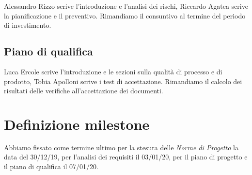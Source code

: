 \documentclass{article}
\begin{document}
Alessandro Rizzo scrive l'introduzione e l'analisi dei rischi, Riccardo Agatea scrive la pianificazione e il preventivo. Rimandiamo il consuntivo al termine del periodo di investimento.

\subsection{Piano di qualifica}%
\label{sub:piano_di_qualifica}
Luca Ercole scrive l'introduzione e le sezioni sulla qualità di processo e di prodotto, Tobia Apolloni scrive i test di accettazione. Rimandiamo il calcolo dei risultati delle verifiche all'accettazione dei documenti.

\section{Definizione milestone}%
\label{sec:definizione_milestone}

Abbiamo fissato come termine ultimo per la stesura delle \textit{Norme di Progetto} la data del 30/12/19, per l'analisi dei requisiti il 03/01/20, per il piano di progetto e il piano di qualifica il 07/01/20.

\end{document}
